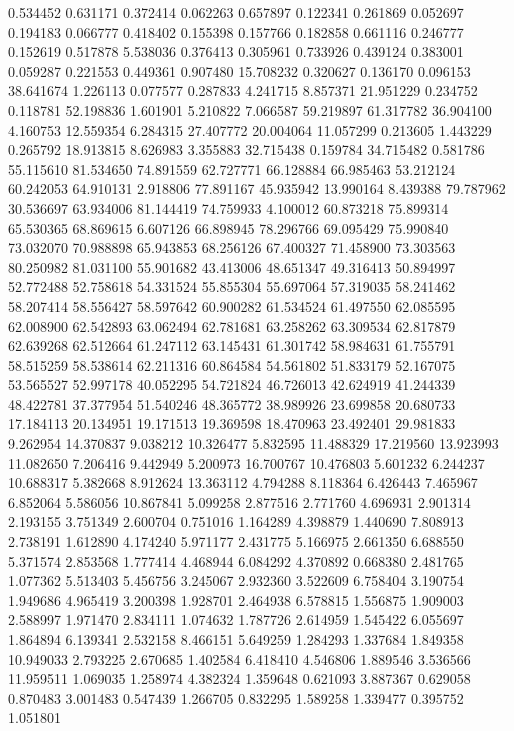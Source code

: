 0.534452
0.631171
0.372414
0.062263
0.657897
0.122341
0.261869
0.052697
0.194183
0.066777
0.418402
0.155398
0.157766
0.182858
0.661116
0.246777
0.152619
0.517878
5.538036
0.376413
0.305961
0.733926
0.439124
0.383001
0.059287
0.221553
0.449361
0.907480
15.708232
0.320627
0.136170
0.096153
38.641674
1.226113
0.077577
0.287833
4.241715
8.857371
21.951229
0.234752
0.118781
52.198836
1.601901
5.210822
7.066587
59.219897
61.317782
36.904100
4.160753
12.559354
6.284315
27.407772
20.004064
11.057299
0.213605
1.443229
0.265792
18.913815
8.626983
3.355883
32.715438
0.159784
34.715482
0.581786
55.115610
81.534650
74.891559
62.727771
66.128884
66.985463
53.212124
60.242053
64.910131
2.918806
77.891167
45.935942
13.990164
8.439388
79.787962
30.536697
63.934006
81.144419
74.759933
4.100012
60.873218
75.899314
65.530365
68.869615
6.607126
66.898945
78.296766
69.095429
75.990840
73.032070
70.988898
65.943853
68.256126
67.400327
71.458900
73.303563
80.250982
81.031100
55.901682
43.413006
48.651347
49.316413
50.894997
52.772488
52.758618
54.331524
55.855304
55.697064
57.319035
58.241462
58.207414
58.556427
58.597642
60.900282
61.534524
61.497550
62.085595
62.008900
62.542893
63.062494
62.781681
63.258262
63.309534
62.817879
62.639268
62.512664
61.247112
63.145431
61.301742
58.984631
61.755791
58.515259
58.538614
62.211316
60.864584
54.561802
51.833179
52.167075
53.565527
52.997178
40.052295
54.721824
46.726013
42.624919
41.244339
48.422781
37.377954
51.540246
48.365772
38.989926
23.699858
20.680733
17.184113
20.134951
19.171513
19.369598
18.470963
23.492401
29.981833
9.262954
14.370837
9.038212
10.326477
5.832595
11.488329
17.219560
13.923993
11.082650
7.206416
9.442949
5.200973
16.700767
10.476803
5.601232
6.244237
10.688317
5.382668
8.912624
13.363112
4.794288
8.118364
6.426443
7.465967
6.852064
5.586056
10.867841
5.099258
2.877516
2.771760
4.696931
2.901314
2.193155
3.751349
2.600704
0.751016
1.164289
4.398879
1.440690
7.808913
2.738191
1.612890
4.174240
5.971177
2.431775
5.166975
2.661350
6.688550
5.371574
2.853568
1.777414
4.468944
6.084292
4.370892
0.668380
2.481765
1.077362
5.513403
5.456756
3.245067
2.932360
3.522609
6.758404
3.190754
1.949686
4.965419
3.200398
1.928701
2.464938
6.578815
1.556875
1.909003
2.588997
1.971470
2.834111
1.074632
1.787726
2.614959
1.545422
6.055697
1.864894
6.139341
2.532158
8.466151
5.649259
1.284293
1.337684
1.849358
10.949033
2.793225
2.670685
1.402584
6.418410
4.546806
1.889546
3.536566
11.959511
1.069035
1.258974
4.382324
1.359648
0.621093
3.887367
0.629058
0.870483
3.001483
0.547439
1.266705
0.832295
1.589258
1.339477
0.395752
1.051801
